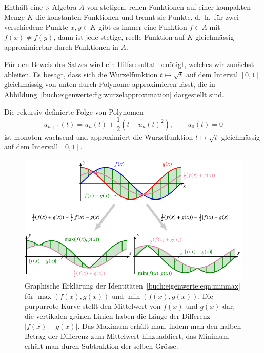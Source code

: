 \begin{satz}
\label{buch:satz:stone-weierstrass}
Enthält eine $\mathbb{R}$-Algebra $A$ von stetigen, rellen Funktionen
auf einer kompakten Menge $K$ die konstanten Funktionen und trennt sie
Punkte, d.~h.~für zwei verschiedene Punkte $x,y\in K$ gibt es
immer eine Funktion $f\in A$ mit $f(x)\ne f(y)$, dann ist jede stetige,
reelle Funktion auf $K$ gleichmässig approximierbar durch Funktionen 
in $A$.
\end{satz}

Für den Beweis des Satzes wird ein Hilfsresultat benötigt, welches wir
zunächst ableiten.
Es besagt, dass sich die Wurzelfunktion $t\mapsto\sqrt{t}$
auf dem Interval $[0,1]$ gleichmässig
von unten durch Polynome approximieren lässt, die in
Abbildung~\ref{buch:eigenwerte:fig:wurzelapproximation} dargestellt
sind.

\begin{satz}
Die rekursiv definierte Folge von Polynomen
\begin{equation}
u_{n+1}(t)
=
u_n(t) + \frac12(t-u_n(t)^2),
\qquad
u_0(t)=0
\label{buch:eigenwerte:eqn:wurzelapproximation}
\end{equation}
ist monoton wachsend und approximiert die Wurzelfunktion $t\mapsto\sqrt{t}$
gleichmässig auf dem Intervall $[0,1]$.
\end{satz}

\begin{figure}
\centering
\includegraphics{chapters/40-eigenwerte/images/minmax.pdf}
\caption{Graphische Erklärung der
Identitäten~\eqref{buch:eigenwerte:eqn:minmax} für
$\max(f(x),g(x))$ und $\min(f(x),g(x))$.
Die purpurrote Kurve stellt den Mittelwert von $f(x)$ und $g(x)$ dar,
die vertikalen grünen Linien haben die Länge der Differenz $|f(x)-g(x)|$.
Das Maximum erhält man, indem man den halben Betrag der Differenz zum
Mittelwert hinzuaddiert, das Minimum erhält man durch Subtraktion
der selben Grösse.
\label{buch:eigenwerte:fig:minmax}}
\end{figure}


